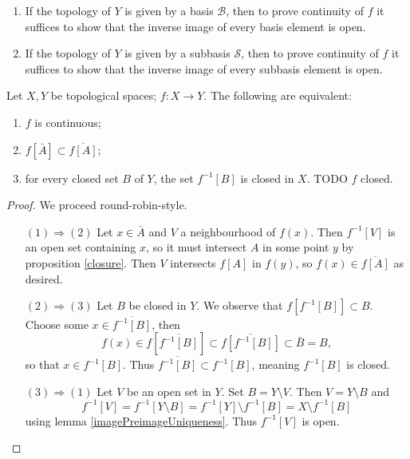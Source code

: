 \begin{lemma}
\begin{enumerate}
\item If the topology of $Y$ is given by a basis $\mathcal{B}$, then to prove continuity of $f$ it suffices to show that the inverse image of every basis element is open.
\item If the topology of $Y$ is given by a subbasis $\mathcal{S}$, then to prove continuity of $f$ it suffices to show that the inverse image of every subbasis element is open.
\end{enumerate}
\end{lemma}
\begin{proposition}\label{continuity}
Let $X, Y$ be topological spaces; $f:X\to Y$. The following are equivalent:
\begin{enumerate}
\item $f$ is continuous;
\item $f[\bar{A}]\subset \overline{f[A]}$;
\item for every closed set $B$ of $Y$, the set $f^{-1}[B]$ is closed in $X$. TODO $f$ closed.
\end{enumerate}
\end{proposition}
\begin{proof}
We proceed round-robin-style.
\begin{itemize}[leftmargin=2cm]
\item[$\boxed{(1) \Rightarrow (2)}$] Let $x\in \bar{A}$ and $V$ a neighbourhood of $f(x)$. Then $f^{-1}[V]$ is an open set containing $x$, so it must intersect $A$ in some point $y$ by proposition \ref{closure}. Then $V$ intersects $f[A]$ in $f(y)$, so $f(x) \in \overline{f[A]}$ as desired.
\item[$\boxed{(2) \Rightarrow (3)}$] Let $B$ be closed in $Y$. We observe that $f[f^{-1}[B]]\subset B$. Choose some $x\in \overline{f^{-1}[B]}$, then
\[ f(x) \in f\left[\overline{f^{-1}[B]}\right] \subset \overline{f[f^{-1}[B]]} \subset \bar{B} = B, \]
so that $x\in f^{-1}[B]$. Thus $\overline{f^{-1}[B]}\subset f^{-1}[B]$, meaning $f^{-1}[B]$ is closed.
\item[$\boxed{(3) \Rightarrow (1)}$] Let $V$ be an open set in $Y$. Set $B = Y\setminus V$. Then $V = Y\setminus B$ and
\[ f^{-1}[V] = f^{-1}[Y\setminus B] = f^{-1}[Y]\setminus f^{-1}[B] = X \setminus f^{-1}[B]\]
using lemma \ref{imagePreimageUniqueness}. Thus $f^{-1}[V]$ is open.
\end{itemize}
\end{proof}

